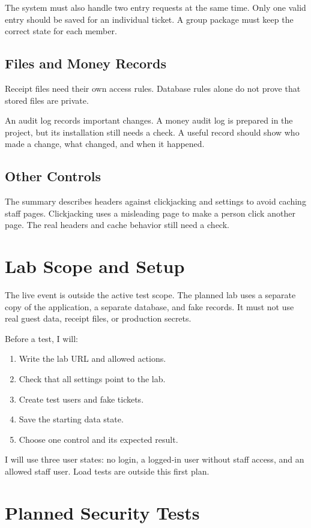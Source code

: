 \documentclass[conference]{IEEEtran}
\begin{document}
The system must also handle two entry requests at the same time. Only one valid entry should be saved for an individual ticket. A group package must keep the correct state for each member.

\subsection{Files and Money Records}
Receipt files need their own access rules. Database rules alone do not prove that stored files are private.

An audit log records important changes. A money audit log is prepared in the project, but its installation still needs a check. A useful record should show who made a change, what changed, and when it happened.

\subsection{Other Controls}
The summary describes headers against clickjacking and settings to avoid caching staff pages. Clickjacking uses a misleading page to make a person click another page. The real headers and cache behavior still need a check.

\section{Lab Scope and Setup}
The live event is outside the active test scope. The planned lab uses a separate copy of the application, a separate database, and fake records. It must not use real guest data, receipt files, or production secrets.

Before a test, I will:
\begin{enumerate}
\item Write the lab URL and allowed actions.
\item Check that all settings point to the lab.
\item Create test users and fake tickets.
\item Save the starting data state.
\item Choose one control and its expected result.
\end{enumerate}

I will use three user states: no login, a logged-in user without staff access, and an allowed staff user. Load tests are outside this first plan.

\section{Planned Security Tests}
\end{document}
